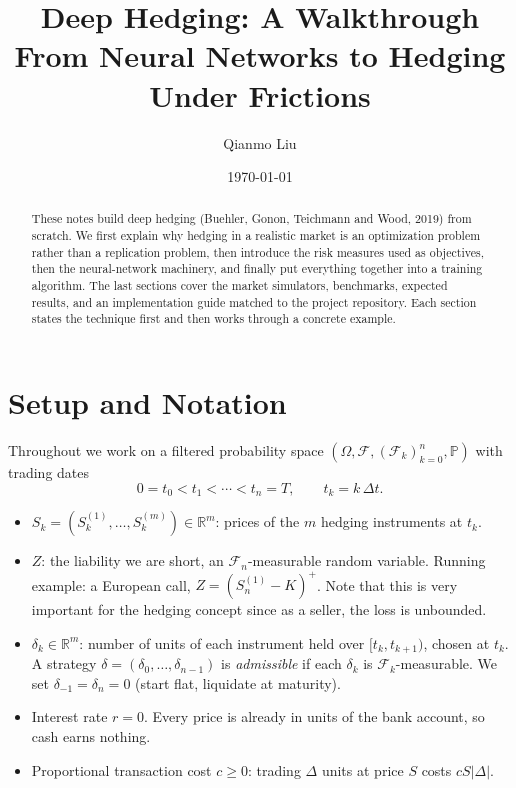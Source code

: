 \documentclass[11pt]{article}
\title{Deep Hedging: A Walkthrough\\[4pt]
\large From Neural Networks to Hedging Under Frictions}
\author{Qianmo Liu}
\date{\today}
\theoremstyle{definition}
\theoremstyle{remark}
\newcommand{\R}{\mathbb{R}}
\begin{document}
\maketitle

\begin{abstract}
These notes build deep hedging (Buehler, Gonon, Teichmann and Wood, 2019) from scratch.
We first explain why hedging in a realistic market is an optimization problem rather than
a replication problem, then introduce the risk measures used as objectives, then the
neural-network machinery, and finally put everything together into a training algorithm.
The last sections cover the market simulators, benchmarks, expected results, and an
implementation guide matched to the project repository. Each section states the
technique first and then works through a concrete example.
\end{abstract}

\tableofcontents
\newpage

\section{Setup and Notation}

Throughout we work on a filtered probability space $(\Omega,\mathcal F,(\mathcal F_k)_{k=0}^n,\mathbb P)$
with trading dates
\[
0=t_0<t_1<\cdots<t_n=T,\qquad t_k=k\,\Delta t .
\]

\begin{itemize}[leftmargin=*]
  \item $S_k=(S_k^{(1)},\dots,S_k^{(m)})\in\R^m$: prices of the $m$ hedging instruments at $t_k$.
  \item $Z$: the liability we are short, an $\mathcal F_n$-measurable random variable. Running example: a European call, $Z=(S^{(1)}_n-K)^+$. Note that this is very important for the hedging concept since as a seller, the loss is unbounded.
  \item $\delta_k\in\R^m$: number of units of each instrument held over $[t_k,t_{k+1})$, chosen at $t_k$.
        A strategy $\delta=(\delta_0,\dots,\delta_{n-1})$ is \emph{admissible} if each $\delta_k$ is
        $\mathcal F_k$-measurable. We set $\delta_{-1}=\delta_n=0$ (start flat, liquidate at maturity).
  \item Interest rate $r=0$. Every price is already in units of the bank account, so cash earns nothing.
  \item Proportional transaction cost $c\ge 0$: trading $\Delta$ units at price $S$ costs $cS|\Delta|$.
\end{itemize}
\end{document}
